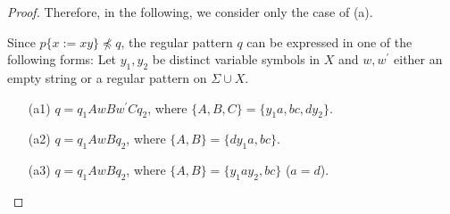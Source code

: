 \begin{proof}
%
  Therefore, in the following, we consider only the case of (a).

  Since $p \{ x := xy \} \not \preceq q$, the regular pattern $q$ can be expressed in one of the following forms: Let $y_{1}, y_{2}$ be distinct variable symbols in $X$ and $w, w^{\prime}$ either an empty string or a regular pattern on $\Sigma\cup X$.
  \begin{enumerate}
  \item[(a1)] $q=q_{1}AwBw^{\prime}Cq_{2}$, where $\{ A,B,C \} = \{ y_{1}a,bc,dy_{2} \}$.
  \item[(a2)] $q=q_{1}AwBq_{2}$, where $\{ A,B \} = \{ dy_{1}a,bc \}$.
  \item[(a3)] $q=q_{1}AwBq_{2}$, where $\{ A,B \} = \{ y_{1}ay_{2},bc \}$ ($a = d$).
  \end{enumerate}
  

\end{proof}
